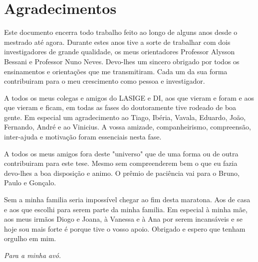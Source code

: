 \pagestyle{plain}

\vspace*{2cm}
\chapter*{Agradecimentos}


Este documento encerra todo trabalho feito ao longo de alguns anos desde o mestrado até agora. 
Durante estes anos tive a sorte de trabalhar com dois investigadores de grande qualidade, os meus orientadores Professor Alysson Bessani e Professor Nuno Neves.
Devo-lhes um sincero obrigado por todos os ensinamentos e orientações que me transmitiram. 
Cada um da sua forma contribuiram para o meu crescimento como pessoa e investigador. 

A todos os meus colegas e amigos do LASIGE e DI, aos que vieram e foram e aos que vieram  e ficam, em todas as fases do doutoramente tive rodeado de boa gente. Em especial um agradecimento ao Tiago, Ibéria, Vavala, Eduardo, João, Fernando, André e ao Vinicius. A vossa amizade, companheirismo, compreensão, inter-ajuda e motivação foram essenciais nesta fase.  

A todos os meus amigos fora deste "universo" que de uma forma ou de outra contribuiram para este tese. 
Mesmo sem compreenderem bem o que eu fazia devo-lhes a boa disposição e animo. 
O prêmio de paciência vai para o Bruno, Paulo e Gonçalo.


Sem a minha familia seria impossível chegar ao fim desta maratona. 
Aos de casa e aos que escolhi para serem parte da minha familia.
Em especial à minha mãe, aos meus irmãos Diogo e Joana, à Vanessa e à Ana por serem incansáveis e se hoje sou mais forte é porque tive o vosso apoio.
Obrigado e espero que tenham orgulho em mim. 






\LIMPA
\LIMPA

\vfill


\begin{flushright}\textit{Para a minha avó.}\end{flushright}

\LIMPA
